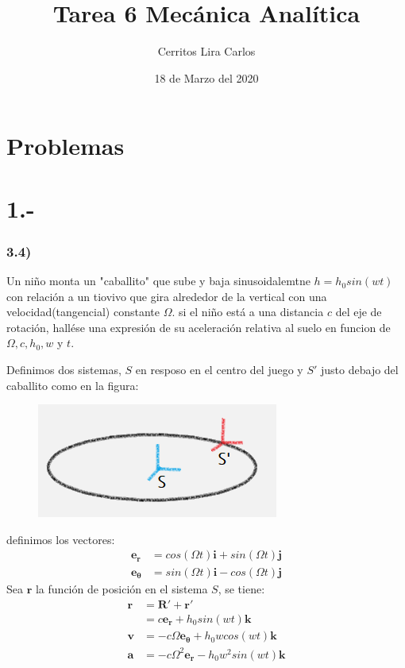 \documentclass{article}
\title{Tarea 6 Mecánica Analítica}
\author{Cerritos Lira Carlos}
\date{18 de Marzo del 2020}
\begin{document}
\maketitle
\section*{Problemas}
\section*{1.-}
\subsubsection*{3.4)}
Un niño monta un "caballito" que sube y baja sinusoidalemtne $h=h_0sin(wt)$ con 
relación a un tiovivo que gira alrededor de la vertical con una velocidad(tangencial)
constante $\Omega$. si el niño está a una distancia $c$ del eje de rotación, 
hallése una expresión de su aceleración relativa al suelo en funcion de $\Omega, c, h_0, w$ 
y $t$. 
\begin{tcolorbox}[breakable]
    Definimos dos sistemas, $S$ en resposo en el centro del juego y $S'$ justo debajo del 
    caballito como en la figura:
    \begin{figure}[H]
        \centering
        \includegraphics[]{p1_horse.png}
    \end{figure}
    definimos los vectores:
    \begin{align*}
        \bm{e_r} &= cos(\Omega t) \bm{i} + sin(\Omega t) \bm{j} \\ 
        \bm{e_\theta} &= sin(\Omega t)\bm{i} - cos(\Omega t) \bm{j}
    \end{align*}
    Sea $\bm{r}$ la función de posición en el sistema $S$, se tiene:
    \begin{align*}
        \bm{r} 
        &= \bm{R'} + \bm{r'} \\
        &= c\bm{e_r} + h_0sin(wt)\bm{k} \\
        \bm{v} &= -c\Omega\bm{e_\theta} + h_0wcos(wt)\bm{k} \\
        \bm{a} &= -c\Omega^2\bm{e_r} - h_0w^2sin(wt)\bm{k} \\
    \end{align*}
\end{tcolorbox}
\end{document}
